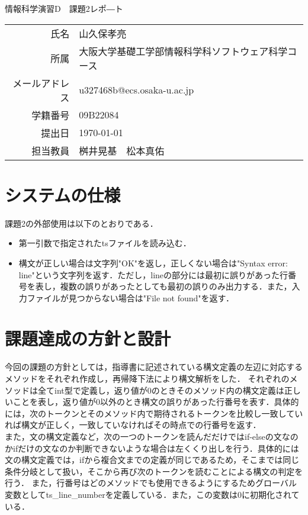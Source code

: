 \documentclass[dvipdfmx]{jarticle}
\begin{document}
\begin{titlepage}
    \begin{center}
        {\huge 情報科学演習D　課題2レポ―ト}
        \vspace{180pt}\\
        \begin{tabular}{rl}
            氏名 & 山久保孝亮\\
            所属 & 大阪大学基礎工学部情報科学科ソフトウェア科学コース\\
            メールアドレス & u327468b@ecs.osaka-u.ac.jp\\
            学籍番号 & 09B22084\\
            提出日 & \today\\
            担当教員 & 桝井晃基　松本真佑
        \end{tabular}
    \end{center}
\end{titlepage}
\section{システムの仕様}
課題2の外部使用は以下のとおりである．
\begin{itemize}
  \item 第一引数で指定されたtsファイルを読み込む．
  \item 構文が正しい場合は文字列"OK"を返し，正しくない場合は"Syntax error: line"という文字列を返す．ただし，lineの部分には最初に誤りがあった行番号を表し，複数の誤りがあったとしても最初の誤りのみ出力する．また，入力ファイルが見つからない場合は"File not found"を返す．
\end{itemize}
\section{課題達成の方針と設計}
今回の課題の方針としては，指導書に記述されている構文定義の左辺に対応するメソッドをそれぞれ作成し，再帰降下法により構文解析をした．
それぞれのメソッドは全てint型で定義し，返り値が0のときそのメソッド内の構文定義は正しいことを表し，返り値が0以外のとき構文の誤りがあった行番号を表す．具体的には，次のトークンとそのメソッド内で期待されるトークンを比較し一致していれば構文が正しく，一致していなければその時点での行番号を返す．\\
また，文の構文定義など，次の一つのトークンを読んだだけではif-elseの文なのかifだけの文なのか判断できないような場合は左くくり出しを行う．具体的には文の構文定義では，ifから複合文までの定義が同じであるため，そこまでは同じ条件分岐として扱い，そこから再び次のトークンを読むことによる構文の判定を行う．
また，行番号はどのメソッドでも使用できるようにするためグローバル変数としてts\_line\_numberを定義している．また，この変数は0に初期化されている．
\end{document}

